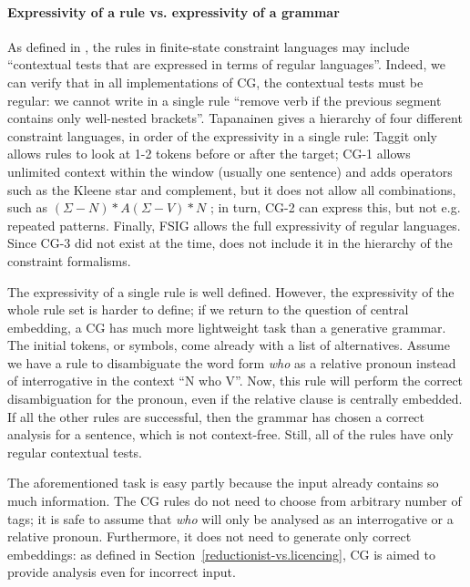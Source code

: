 {\paragraph{Expressivity of a rule vs. expressivity of a grammar}

As defined in \cite{tapanainen1999phd}, the rules in finite-state constraint languages may include ``contextual tests that are expressed in terms of regular languages''. 
Indeed, we can verify that in all implementations of CG, 
the contextual tests must be regular: we cannot write in a single rule ``remove verb if the previous segment contains only well-nested brackets''.
Tapanainen gives a hierarchy of four different constraint languages, in order of the expressivity in a single rule: Taggit \cite{taggit} only allows rules to look at 1-2 tokens before or after the target; CG-1 \cite{karlsson1990cgp} allows unlimited context within the window (usually one sentence) and adds operators such as the Kleene star and complement, but it does not allow all combinations, such as $(\Sigma - N)*A(\Sigma - V)*N$ ; in turn, CG-2 \cite{tapanainen1996} can express this, but not e.g. repeated patterns. Finally, FSIG \cite{koskenniemi90} allows the full expressivity of regular languages. Since CG-3 \cite{bick2015} did not exist at the time, \cite{tapanainen1999phd} does not include it in the hierarchy of the constraint formalisms.

The expressivity of a single rule is well defined. However, the expressivity of the whole rule set is harder to define; if we return to the question of central embedding, a CG has much more lightweight task than a generative grammar. The initial tokens, or symbols, come already with a list of alternatives.
Assume we have a rule to disambiguate the word form \emph{who} as a relative pronoun instead of interrogative in the context ``N who V''. %
Now, this rule will perform the correct disambiguation for the pronoun, even if the relative clause is centrally embedded. If all the other rules are successful, then the grammar has chosen a correct analysis for a sentence, which is not context-free. Still, 
all of the rules have only regular contextual tests.

The aforementioned task is easy partly because the input already contains so much information. The CG rules do not need to choose from arbitrary number of tags; it is safe to assume that \emph{who} will only be analysed as an interrogative or a relative pronoun. Furthermore, it does not need to generate only correct embeddings: as defined in Section~\ref{reductionist-vs.licencing}, CG is aimed to provide analysis even for incorrect input.

}
